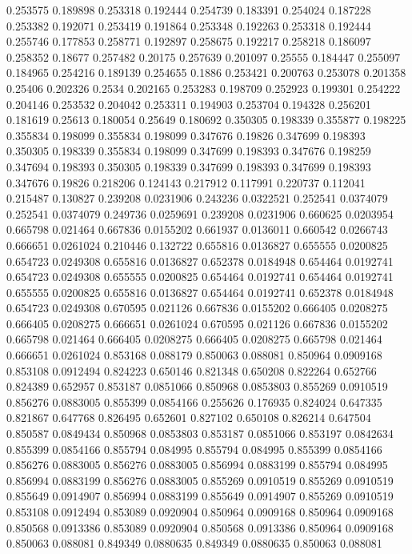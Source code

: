 0.253575 0.189898
0.253318 0.192444
0.254739 0.183391
0.254024 0.187228
0.253382 0.192071
0.253419 0.191864
0.253348 0.192263
0.253318 0.192444
0.255746 0.177853
0.258771 0.192897
0.258675 0.192217
0.258218 0.186097
0.258352 0.18677
0.257482 0.20175
0.257639 0.201097
0.25555 0.184447
0.255097 0.184965
0.254216 0.189139
0.254655 0.1886
0.253421 0.200763
0.253078 0.201358
0.25406 0.202326
0.2534 0.202165
0.253283 0.198709
0.252923 0.199301
0.254222 0.204146
0.253532 0.204042
0.253311 0.194903
0.253704 0.194328
0.256201 0.181619
0.25613 0.180054
0.25649 0.180692
0.350305 0.198339
0.355877 0.198225
0.355834 0.198099
0.355834 0.198099
0.347676 0.19826
0.347699 0.198393
0.350305 0.198339
0.355834 0.198099
0.347699 0.198393
0.347676 0.198259
0.347694 0.198393
0.350305 0.198339
0.347699 0.198393
0.347699 0.198393
0.347676 0.19826
0.218206 0.124143
0.217912 0.117991
0.220737 0.112041
0.215487 0.130827
0.239208 0.0231906
0.243236 0.0322521
0.252541 0.0374079
0.252541 0.0374079
0.249736 0.0259691
0.239208 0.0231906
0.660625 0.0203954
0.665798 0.021464
0.667836 0.0155202
0.661937 0.0136011
0.660542 0.0266743
0.666651 0.0261024
0.210446 0.132722
0.655816 0.0136827
0.655555 0.0200825
0.654723 0.0249308
0.655816 0.0136827
0.652378 0.0184948
0.654464 0.0192741
0.654723 0.0249308
0.655555 0.0200825
0.654464 0.0192741
0.654464 0.0192741
0.655555 0.0200825
0.655816 0.0136827
0.654464 0.0192741
0.652378 0.0184948
0.654723 0.0249308
0.670595 0.021126
0.667836 0.0155202
0.666405 0.0208275
0.666405 0.0208275
0.666651 0.0261024
0.670595 0.021126
0.667836 0.0155202
0.665798 0.021464
0.666405 0.0208275
0.666405 0.0208275
0.665798 0.021464
0.666651 0.0261024
0.853168 0.088179
0.850063 0.088081
0.850964 0.0909168
0.853108 0.0912494
0.824223 0.650146
0.821348 0.650208
0.822264 0.652766
0.824389 0.652957
0.853187 0.0851066
0.850968 0.0853803
0.855269 0.0910519
0.856276 0.0883005
0.855399 0.0854166
0.255626 0.176935
0.824024 0.647335
0.821867 0.647768
0.826495 0.652601
0.827102 0.650108
0.826214 0.647504
0.850587 0.0849434
0.850968 0.0853803
0.853187 0.0851066
0.853197 0.0842634
0.855399 0.0854166
0.855794 0.084995
0.855794 0.084995
0.855399 0.0854166
0.856276 0.0883005
0.856276 0.0883005
0.856994 0.0883199
0.855794 0.084995
0.856994 0.0883199
0.856276 0.0883005
0.855269 0.0910519
0.855269 0.0910519
0.855649 0.0914907
0.856994 0.0883199
0.855649 0.0914907
0.855269 0.0910519
0.853108 0.0912494
0.853089 0.0920904
0.850964 0.0909168
0.850964 0.0909168
0.850568 0.0913386
0.853089 0.0920904
0.850568 0.0913386
0.850964 0.0909168
0.850063 0.088081
0.849349 0.0880635
0.849349 0.0880635
0.850063 0.088081
